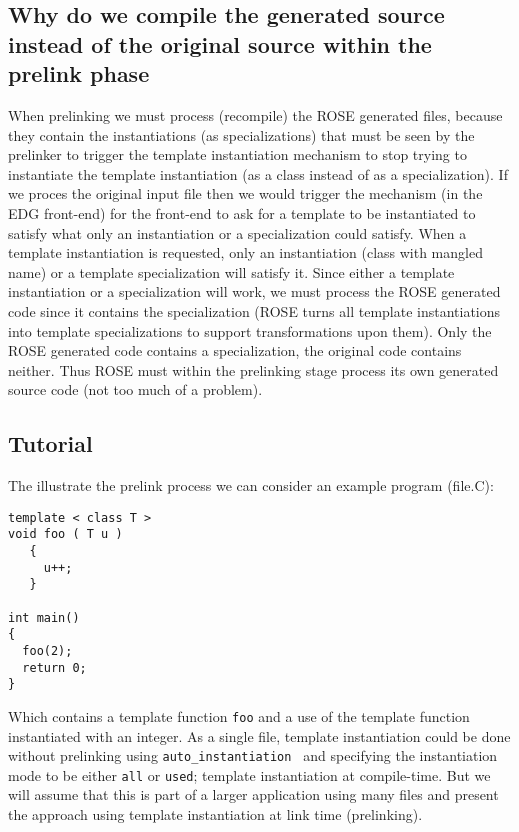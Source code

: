 {\subsection{Why do we compile the generated source instead of the original source within the prelink phase}
   When prelinking we must process (recompile) the ROSE generated files, because they 
contain the instantiations (as specializations) that must be seen by the prelinker to 
trigger the template instantiation mechanism to stop trying to instantiate the template
instantiation (as a class instead of as a specialization).  If we proces the original input file
then we would trigger the mechanism (in the EDG front-end) for the front-end to ask for a template to be
instantiated to satisfy what only an instantiation or a specialization could satisfy.
When a template instantiation is requested, only an instantiation (class with mangled name)
or a template specialization will satisfy it. 
Since either a template instantiation or a specialization will work, we must process
the ROSE generated code since it contains the specialization (ROSE turns all template
instantiations into template specializations to support transformations upon them).
Only the ROSE generated code contains a specialization, the original code contains 
neither.  Thus ROSE must within the prelinking stage process its own generated 
source code (not too much of a problem).

\subsection{Tutorial}

   The illustrate the prelink process we can consider an example program (file.C):

{\indent
{\mySmallFontSize

\begin{verbatim}
template < class T >
void foo ( T u )
   {
     u++;
   }

int main()
{
  foo(2);
  return 0;
}
\end{verbatim}
}}

Which contains a template function {\tt foo} and a use of the template function
instantiated with an integer. As a single file, template instantiation could be done
without prelinking using {\tt auto\_instantiation } and specifying the instantiation
mode to be either {\tt all} or {\tt used}; template instantiation at compile-time.  
But we will assume that this is part of a larger application using many files and 
present the approach using template instantiation at link time (prelinking).


}
